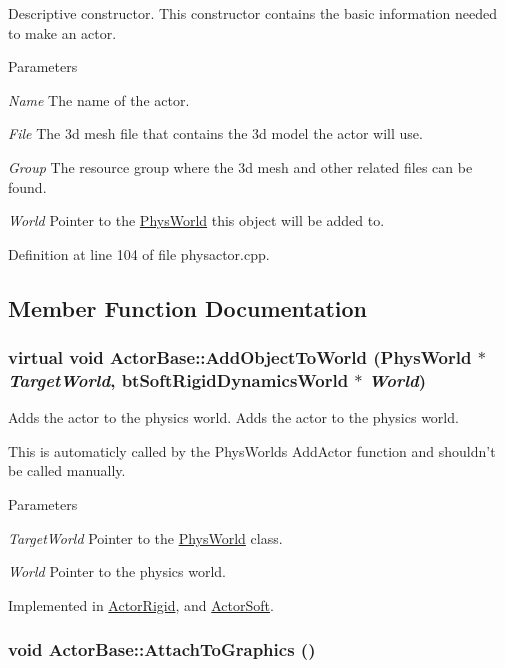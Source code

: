 Descriptive constructor. This constructor contains the basic information needed to make an actor. 
\begin{DoxyParams}{Parameters}
\item[{\em Name}]The name of the actor. \item[{\em File}]The 3d mesh file that contains the 3d model the actor will use. \item[{\em Group}]The resource group where the 3d mesh and other related files can be found. \item[{\em World}]Pointer to the \hyperlink{classPhysWorld}{PhysWorld} this object will be added to. \end{DoxyParams}


Definition at line 104 of file physactor.cpp.

\subsection{Member Function Documentation}
\hypertarget{classActorBase_a1af82a2ed960fd114518fdf84d5ff146}{
\subsubsection[{AddObjectToWorld}]{\setlength{\rightskip}{0pt plus 5cm}virtual void ActorBase::AddObjectToWorld ({\bf PhysWorld} $\ast$ {\em TargetWorld}, \/  btSoftRigidDynamicsWorld $\ast$ {\em World})}}
\label{dd/d7b/classActorBase_a1af82a2ed960fd114518fdf84d5ff146}


Adds the actor to the physics world. Adds the actor to the physics world. \par
 This is automaticly called by the PhysWorlds AddActor function and shouldn't be called manually. 
\begin{DoxyParams}{Parameters}
\item[{\em TargetWorld}]Pointer to the \hyperlink{classPhysWorld}{PhysWorld} class. \item[{\em World}]Pointer to the physics world. \end{DoxyParams}


Implemented in \hyperlink{classActorRigid_ac6d7e05944623329f0c2140c19e2c49e}{ActorRigid}, and \hyperlink{classActorSoft_a0def29f28ed4d126a0634ddc97e33e2f}{ActorSoft}.\hypertarget{classActorBase_afab604970fede16ccde0c6b8e72d9ee0}{
\subsubsection[{AttachToGraphics}]{\setlength{\rightskip}{0pt plus 5cm}void ActorBase::AttachToGraphics ()}}
\label{dd/d7b/classActorBase_afab604970fede16ccde0c6b8e72d9ee0}


